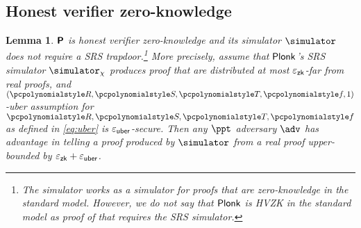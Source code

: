 \documentclass[runningheads,11pt]{llncs}
\newtheorem{lemma}[theorem]{Lemma} \newtheorem{corollary}[theorem]{Corollary}
\theoremstyle{definition} \newtheorem{definition}[theorem]{Definition}
\begin{document}
\subsection{Honest verifier zero-knowledge}
\begin{lemma}
  $\bm{\mathsf{P}}$ is honest verifier zero-knowledge and its simulator $\simulator$ does
  not require a SRS trapdoor.\footnote{The simulator works as a simulator for
    proofs that are zero-knowledge in the standard model. However, we do not say
    that $\textnormal{\textsf{Plonk}}$ is HVZK in the standard model as proof of that \emph{requires}
    the SRS simulator.} More precisely, assume that $\textnormal{\textsf{Plonk}}$'s SRS simulator
  $\simulator_\chi$ produces proof that are distributed at most $\varepsilon_{\mathsf{zk}}$-far
  from real proofs, and $(\pR, \pS, \pT, \pf, 1)$-uber assumption for
  $\pR, \pS, \pT, \pf$ as defined in \cref{eq:uber} is $\varepsilon_{\mathsf{uber}}$-secure. Then
  any $\ppt$ adversary $\adv$ has advantage in telling a proof produced by
  $\simulator$ from a real proof upper-bounded by $\varepsilon_{\mathsf{zk}} + \varepsilon_{\mathsf{uber}}$.
\end{lemma}
\end{document}
